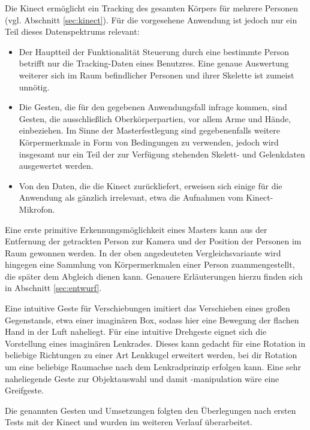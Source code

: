 Die Kinect ermöglicht ein Tracking des gesamten Körpers für mehrere Personen (vgl. Abschnitt \ref{sec:kinect}). Für die vorgesehene Anwendung ist jedoch nur ein Teil dieses Datenspektrums relevant:
\begin{itemize}
\item Der Hauptteil der Funktionalität \glqq{}Steuerung durch eine bestimmte Person\grqq{} betrifft nur die Tracking-Daten eines Benutzres. Eine genaue Auswertung weiterer sich im Raum befindlicher Personen und ihrer Skelette ist zumeist unnötig.
\item Die Gesten, die für den gegebenen Anwendungsfall infrage kommen, sind Gesten, die ausschließlich Oberkörperpartien, vor allem Arme und Hände, einbeziehen. Im Sinne der Masterfestlegung sind gegebenenfalls weitere Körpermerkmale in Form von Bedingungen zu verwenden, jedoch wird insgesamt nur ein Teil der zur Verfügung stehenden Skelett- und Gelenkdaten ausgewertet werden.
\item Von den Daten, die die Kinect zurückliefert, erweisen sich einige für die Anwendung als gänzlich irrelevant, etwa die Aufnahmen vom Kinect-Mikrofon.
\end{itemize}
Eine erste primitive Erkennungsmöglichkeit eines Masters kann aus der Entfernung der getrackten Person zur Kamera und der Position der Personen im Raum gewonnen werden. In der oben angedeuteten Vergleichsvariante wird hingegen eine Sammlung von Körpermerkmalen einer Person zuammengestellt, die später dem Abgleich dienen kann. Genauere Erläuterungen hierzu finden sich in Abschnitt \ref{sec:entwurf}.\par 
Eine intuitive Geste für Verschiebungen imitiert das Verschieben eines großen Gegenstands, etwa einer imaginären Box, sodass hier eine Bewegung der flachen Hand in der Luft naheliegt. Für eine intuitive Drehgeste eignet sich die Vorstellung eines imaginären Lenkrades. Dieses kann gedacht für eine Rotation in beliebige Richtungen zu einer Art Lenkkugel erweitert werden, bei dir Rotation um eine beliebige Raumachse nach dem Lenkradprinzip erfolgen kann. Eine sehr naheliegende Geste zur Objektauswahl und damit -manipulation wäre eine Greifgeste.\par 
Die genannten Gesten und Umsetzungen folgten den Überlegungen nach ersten Tests mit der Kinect und wurden im weiteren Verlauf überarbeitet.

